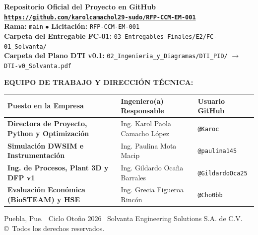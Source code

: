 \documentclass[10pt,letterpaper]{article}
\begin{document}
\begin{titlepage}
    \vspace{0.35cm}
    \begin{tcolorbox}[colframe=navyblue,colback=white,arc=2mm,boxrule=0.8pt]
        \centering
        \textbf{\color{navyblue}\large Repositorio Oficial del Proyecto en GitHub}\\[3pt]
        \href{https://github.com/karolcamachol29-sudo/RFP-CCM-EM-001}{\texttt{\textbf{https://github.com/karolcamachol29-sudo/RFP-CCM-EM-001}}}\\[4pt]
        \footnotesize
        \textbf{Rama:} \texttt{main} \quad $\bullet$ \quad
        \textbf{Licitación:} \texttt{RFP-CCM-EM-001}\\[2pt]
        \textbf{Carpeta del Entregable FC-01:} \texttt{03\_Entregables\_Finales/E2/FC-01\_Solvanta/}\\
        \textbf{Carpeta del Plano DTI v0.1:} \texttt{02\_Ingenieria\_y\_Diagramas/DTI\_PID/} $\to$ \texttt{DTI-v0\_Solvanta.pdf}
    \end{tcolorbox}

    \vspace{0.35cm}
    \textbf{\large EQUIPO DE TRABAJO Y DIRECCIÓN TÉCNICA:}\\[0.2cm]
    \begin{center}
    \footnotesize
    \setlength{\tabcolsep}{6pt}
    \begin{tabularx}{\textwidth}{>{\bfseries}p{5.5cm} X >{\centering\arraybackslash}p{3.2cm}}
        \toprule
        \textbf{Puesto en la Empresa} & \textbf{Ingeniero(a) Responsable} & \textbf{Usuario GitHub} \\
        \midrule
        Directora de Proyecto, Python y Optimización & Ing. Karol Paola Camacho López & \texttt{@Karoc} \\
        Simulación DWSIM e Instrumentación & Ing. Paulina Mota Macip & \texttt{@paulina145} \\
        Ing. de Procesos, Plant 3D y DFP v1 & Ing. Gildardo Ocaña Barrales & \texttt{@GildardoOca25} \\
        Evaluación Económica (BioSTEAM) y HSE & Ing. Grecia Figueroa Rincón & \texttt{@Cho0bb} \\
        \bottomrule
    \end{tabularx}
    \end{center}

    \vfill
    {\footnotesize Puebla, Pue. \textbar\ Ciclo Otoño 2026 \textbar\ Solvanta Engineering Solutions S.A. de C.V. \copyright\ Todos los derechos reservados.}
\end{titlepage}
\end{document}
